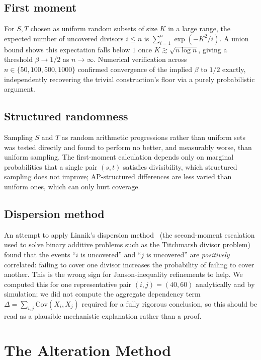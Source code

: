 \documentclass[12pt]{article}
\theoremstyle{remark}
\begin{document}
\subsection{First moment}

For $S, T$ chosen as uniform random subsets of size $K$ in a large range, the
expected number of uncovered divisors $i \le n$ is $\sum_{i=1}^{n}
\exp(-K^2/i)$.  A union bound shows this expectation falls below $1$ once $K
\gtrsim \sqrt{n \log n}$, giving a threshold $\beta \to 1/2$ as $n \to \infty$.
Numerical verification across $n \in \{50, 100, 500, 1000\}$ confirmed
convergence of the implied $\beta$ to $1/2$ exactly, independently recovering
the trivial construction's floor via a purely probabilistic argument.

\subsection{Structured randomness}

Sampling $S$ and $T$ as random arithmetic progressions rather than uniform sets
was tested directly and found to perform no better, and measurably worse, than
uniform sampling.  The first-moment calculation depends only on marginal
probabilities that a single pair $(s,t)$ satisfies divisibility, which
structured sampling does not improve; AP-structured differences are less varied
than uniform ones, which can only hurt coverage.

\subsection{Dispersion method}

An attempt to apply Linnik's dispersion method~\cite{linnik1963} (the
second-moment escalation used to solve binary additive problems such as the
Titchmarsh divisor problem) found that the events ``$i$ is uncovered'' and
``$j$ is uncovered'' are \emph{positively} correlated: failing to cover one
divisor increases the probability of failing to cover another.  This is the
wrong sign for Janson-inequality refinements to help.  We computed this for one
representative pair $(i,j) = (40, 60)$ analytically and by simulation; we did
not compute the aggregate dependency term $\Delta = \sum_{i,j} \mathrm{Cov}(X_i,
X_j)$ required for a fully rigorous conclusion, so this should be read as a
plausible mechanistic explanation rather than a proof.

\section{The Alteration Method}
\end{document}

